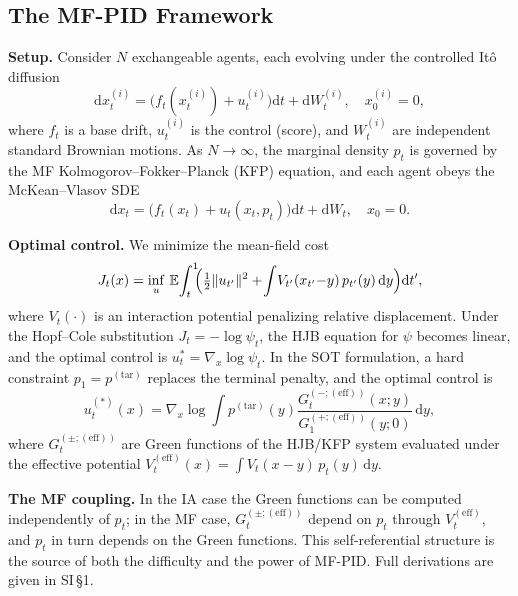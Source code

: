 \documentclass[11pt,onecolumn]{article}
\newcommand{\dd}{\mathrm{d}}
\newcommand{\mfeff}{(\mathrm{eff})}
\newcommand{\ptar}{p^{(\mathrm{tar})}}
\newcommand{\sstar}{u^{(*)}}
\newcommand{\Veff}{V^{(\mathrm{eff})}}
\begin{document}
\subsection*{The MF-PID Framework}

\textbf{Setup.}
Consider $N$ exchangeable agents, each evolving under the controlled
It\^o diffusion
\begin{equation}
  \dd x_t^{(i)}
  = \bigl(f_t(x_t^{(i)}) + u_t^{(i)}\bigr)\dd t + \dd W_t^{(i)},
  \quad x_0^{(i)} = 0,
  \label{eq:sde-agent}
\end{equation}
where $f_t$ is a base drift, $u_t^{(i)}$ is the control (score),
and $W_t^{(i)}$ are independent standard Brownian motions.
As $N\to\infty$, the marginal density $p_t$ is governed by the MF
Kolmogorov--Fokker--Planck (KFP) equation, and each agent obeys the
McKean--Vlasov SDE
\begin{equation}
  \dd x_t = \bigl(f_t(x_t) + u_t(x_t, p_t)\bigr)\dd t + \dd W_t,
  \quad x_0 = 0.
  \label{eq:mckean}
\end{equation}

\textbf{Optimal control.}
We minimize the mean-field cost
\begin{equation}
  J_t(x) = \inf_u \,\mathbb{E}\!\int_t^1\!\!
    \Bigl(\tfrac{1}{2}\|u_{t'}\|^2
    + \!\int\! V_{t'}(x_{t'}{-}y)\,p_{t'}(y)\,\dd y
    \Bigr)\dd t',
  \label{eq:cost}
\end{equation}
where $V_t(\cdot)$ is an interaction potential penalizing relative
displacement.
Under the Hopf--Cole substitution $J_t = -\log\psi_t$, the HJB
equation for $\psi$ becomes linear, and the optimal control is
$u_t^* = \nabla_x\!\log\psi_t$.
In the SOT formulation, a hard constraint $p_1 = \ptar$ replaces
the terminal penalty, and the optimal control is
\begin{equation}
  \sstar_t(x)
  = \nabla_x \log \int\!\! \ptar(y)
      \frac{G_t^{(-;\mfeff)}(x;y)}{G_1^{(+;\mfeff)}(y;0)}\,\dd y,
  \label{eq:u-star-SOT}
\end{equation}
where $G_t^{(\pm;\mfeff)}$ are Green functions of the HJB/KFP system
evaluated under the effective potential
$\Veff_t(x) = \int V_t(x{-}y)\,p_t(y)\,\dd y$.

\textbf{The MF coupling.}
In the IA case the Green functions can be computed independently of
$p_t$; in the MF case, $G_t^{(\pm;\mfeff)}$ depend on $p_t$ through
$\Veff_t$, and $p_t$ in turn depends on the Green functions.
This self-referential structure is the source of both the difficulty
and the power of MF-PID.
Full derivations are given in SI\,\S1.
\end{document}

